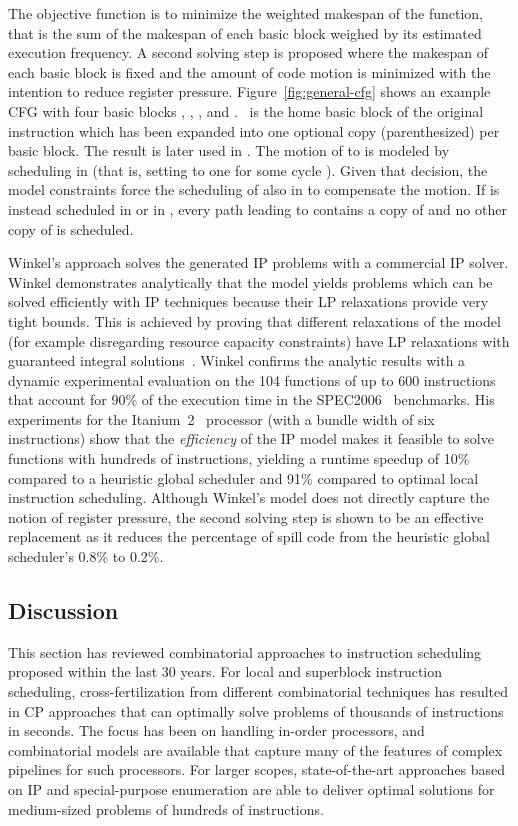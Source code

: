 \documentclass[acmsmall,authorversion,nonacm]{acmart}
\newcommand{\var}[2]{}
\begin{document}
The objective function is to minimize the weighted makespan of the
function, that is the sum of the makespan of each basic block weighed
by its estimated execution frequency.
A second solving step is proposed where the makespan of each basic
block is fixed and the amount of code motion is minimized with the
intention to reduce register pressure.
Figure~\ref{fig:general-cfg} shows an example CFG with four basic
blocks , , , and .
~is the home basic block of the original instruction  which
has been expanded into one optional copy (parenthesized) per basic
block.
The result  is later used in .
The motion of  to  is modeled by scheduling  in 
(that is, setting \var{s}{i,k,\B{2}} to one for some cycle ).
Given that decision, the model constraints force the scheduling of 
also in  to compensate the motion.
If  is instead scheduled in  or in , every path
leading to  contains a copy of  and no other copy of  is
scheduled.

Winkel's approach solves the generated IP problems with a commercial
IP solver.
Winkel demonstrates analytically that the model yields problems which
can be solved efficiently with IP techniques because their LP
relaxations provide very tight bounds.
This is achieved by proving that different relaxations of the model
(for example disregarding resource capacity constraints) have LP
relaxations with guaranteed integral solutions~\cite[Chapter
  5]{Winkel2004b}.
Winkel confirms the analytic results with a dynamic experimental
evaluation on the 104 functions of up to 600 instructions that account
for 90\% of the execution time in the SPEC2006~\cite{CPU}
benchmarks.
His experiments for the Itanium~2~\cite{McNairy2003} processor (with a
bundle width of six instructions) show that the \emph{efficiency} of
the IP model makes it feasible to solve functions with hundreds of
instructions, yielding a runtime speedup of 10\% compared to a
heuristic global scheduler and 91\% compared to optimal local
instruction scheduling.
Although Winkel's model does not directly capture the notion of
register pressure, the second solving step is shown to be an effective
replacement as it reduces the percentage of spill code from the
heuristic global scheduler's 0.8\% to 0.2\%.


\subsection{Discussion}
\label{sec:instruction-scheduling-discussion}

This section has reviewed combinatorial approaches to instruction
scheduling proposed within the last 30 years.
For local and superblock instruction scheduling, cross-fertilization
from different combinatorial techniques has resulted in CP approaches
that can optimally solve problems of thousands of instructions in
seconds.
The focus has been on handling in-order processors, and combinatorial
models are available that capture many of the features of complex
pipelines for such processors.
For larger scopes, state-of-the-art approaches based on IP and
special-purpose enumeration are able to deliver optimal solutions for
medium-sized problems of hundreds of instructions.
\end{document}
